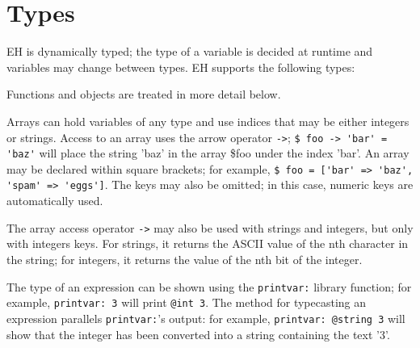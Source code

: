 \documentclass{article}
\begin{document}
\section{Types}
EH is dynamically typed; the type of a variable is decided at runtime and variables may change between types. 
EH supports the following types:
Functions and objects are treated in more detail below.

Arrays can hold variables of any type and use indices that may be either integers or strings. 
Access to an array uses the arrow operator \verb#->#; \verb#$ foo -> 'bar' = 'baz'# will place the string 'baz' in the array \$foo under the index 'bar'. 
An array may be declared within square brackets; for example, \verb#$ foo = ['bar' => 'baz', 'spam' => 'eggs']#. 
The keys may also be omitted; in this case, numeric keys are automatically used.

The array access operator \verb#-># may also be used with strings and integers, but only with integers keys. 
For strings, it returns the ASCII value of the nth character in the string; for integers, it returns the value of the nth bit of the integer.

The type of an expression can be shown using the \verb#printvar:# library function; for example, \verb#printvar: 3# will print \verb#@int 3#. 
The method for typecasting an expression parallels \verb#printvar:#'s output: for example, \verb#printvar: @string 3# will show that the integer has been converted into a string containing the text '3'.
\end{document}

